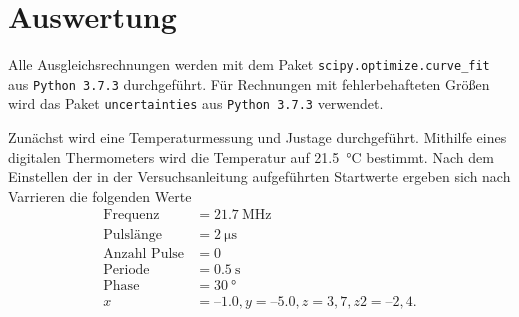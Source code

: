 \section{Auswertung}

Alle Ausgleichsrechnungen werden mit dem Paket \texttt{scipy.optimize.curve\_fit}  aus \texttt{Python 3.7.3} durchgeführt.
Für Rechnungen mit fehlerbehafteten Größen wird das Paket \texttt{uncertainties} aus \texttt{Python 3.7.3} verwendet.

Zunächst wird eine Temperaturmessung und Justage durchgeführt. Mithilfe eines digitalen Thermometers wird die Temperatur 
auf \SI{21.5}{\degreeCelsius} bestimmt. Nach dem Einstellen der in der Versuchsanleitung \cite{anleitung} aufgeführten Startwerte
ergeben sich nach Varrieren die folgenden Werte
\begin{align}
  \text{Frequenz}&=\SI{21.7}{\mega\hertz} \\
  \text{Pulslänge}&=\SI{2}{\micro\second} \\
  \text{Anzahl Pulse}&=0 \\
  \text{Periode}&=\SI{0.5}{\second} \\
  \text{Phase} &= \SI{30}{\degree} \\
    x&=–1.0,y=–5.0,z=3,7,z2=–2,4 .
\end{align}

